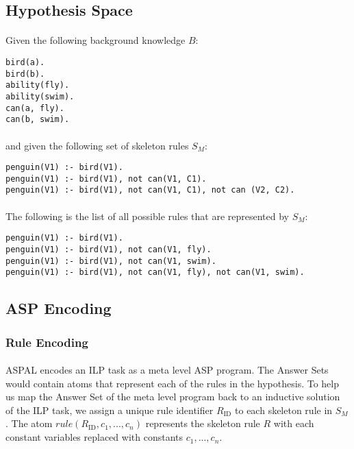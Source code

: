 \documentclass{article}
\theoremstyle{plain}
\theoremstyle{definition}
\begin{document}
\begin{multicols}{2}
\subsection{Hypothesis Space}\label{sec:ASPALHypothesisSpace}

\paragraph{} Given the following background knowledge $B$:

\begin{lstlisting}
bird(a).
bird(b).
ability(fly).
ability(swim).
can(a, fly).
can(b, swim).
\end{lstlisting}

\paragraph{} and given the following set of skeleton rules $S_M$:

\begin{lstlisting}
penguin(V1) :- bird(V1).
penguin(V1) :- bird(V1), not can(V1, C1).
penguin(V1) :- bird(V1), not can(V1, C1), not can (V2, C2).
\end{lstlisting}

\paragraph{} The following is the list of all possible rules that are represented by $S_M$:

\begin{lstlisting}
penguin(V1) :- bird(V1).
penguin(V1) :- bird(V1), not can(V1, fly).
penguin(V1) :- bird(V1), not can(V1, swim).
penguin(V1) :- bird(V1), not can(V1, fly), not can(V1, swim).
\end{lstlisting}

\subsection{ASP Encoding}

\subsubsection{Rule Encoding}

\paragraph{} ASPAL encodes an ILP task as a meta level ASP program. The Answer Sets would contain atoms that represent each of the rules in the hypothesis. To help us map the Answer Set of the meta level program back to an inductive solution of the ILP task, we assign a unique rule identifier $R_\text{ID}$ to each skeleton rule in $S_M$. The atom $rule(R_\text{ID}, c_1, ..., c_n)$ represents the skeleton rule $R$ with each constant variables replaced with constants $c_1, ..., c_n$.


\end{multicols}
\end{document}
